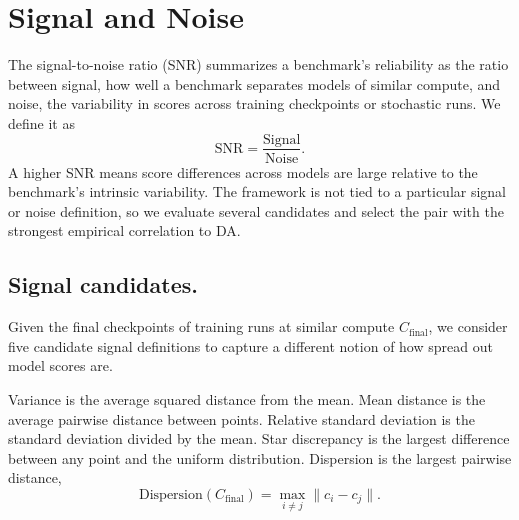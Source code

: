 \clearpage

\section{Signal and Noise}
\label{app:methodology-snr}

The signal-to-noise ratio (SNR) summarizes a benchmark's reliability as the ratio between signal, how well a benchmark separates models of similar compute, and noise, the variability in scores across training checkpoints or stochastic runs.
We define it as
\begin{equation}
\text{SNR} = \frac{\text{Signal}}{\text{Noise}}.
\end{equation}
A higher SNR means score differences across models are large relative to the benchmark's intrinsic variability. The framework is not tied to a particular signal or noise definition, so we evaluate several candidates and select the pair with the strongest empirical correlation to DA.



\subsection{Signal candidates.}
\label{app:measuring-signal}

Given the final checkpoints of training runs at similar compute $C_\text{final}$, we consider five candidate signal definitions to capture a different notion of how spread out model scores are.

Variance is the average squared distance from the mean. Mean distance is the average pairwise distance between points. Relative standard deviation is the standard deviation divided by the mean. Star discrepancy is the largest difference between any point and the uniform distribution. Dispersion is the largest pairwise distance,
\begin{equation}
\text{Dispersion}(C_\text{final}) = \max_{i \neq j} \|c_i - c_j\|.
\end{equation}

